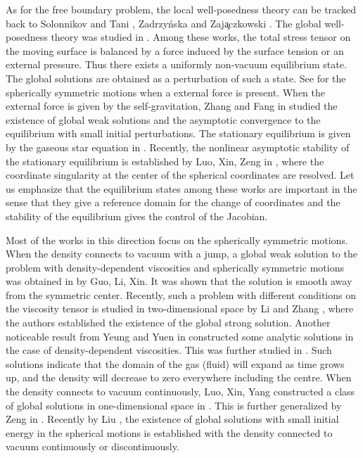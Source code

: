 \documentclass[12pt,a4paper]{amsart}
\numberwithin{equation}{section}
\theoremstyle{plain}
\theoremstyle{definition}
\begin{document}
As for the free boundary problem, the local well-posedness theory can be tracked back to Solonnikov and Tani \cite{Solonnikov1992}, Zadrzy\'nska and Zaj\c{a}czkowski \cite{Zadrzynska2001,Zadrzynska1994,Zajaczkowski1993,Zajaczkowski1995}. The global well-posedness theory was studied in \cite{Zajaczkowski1999,Zajaczkowski1993,Zajaczkowski1994}. Among these works, the total stress tensor on the moving surface is balanced by a force induced by the surface tension or an external pressure. Thus there exists a uniformly non-vacuum equilibrium state. The global solutions are obtained as a perturbation of such a state. See \cite{Zhang2007} for the spherically symmetric motions when a external force is present. When the external force is given by the self-gravitation, Zhang and Fang in \cite{Zhang2009} studied the existence of global weak solutions and the asymptotic convergence to the equilibrium with small initial perturbations. The stationary equilibrium is given by the gaseous star equation in \cite{Auchmuty1971,Chandrasekhar1957,Lieb1987}. 
Recently, %
the nonlinear asymptotic stability of the stationary equilibrium is established by Luo, Xin, Zeng in \cite{Luo2016a,Luo2016b}, where the coordinate singularity at the center of the spherical coordinates are resolved. Let us emphasize that the equilibrium states among these works are important in the sense that they give a reference domain for the change of coordinates and the stability of the equilibrium gives the control of the Jacobian. 

Most of the works in this direction focus on the spherically symmetric motions. When the density connects to vacuum with a jump, a global weak solution to the problem with density-dependent viscosities and spherically symmetric motions was obtained in \cite{Guo2012a} by Guo, Li, Xin. It was shown that the solution is smooth away from the symmetric center. Recently, such a problem with different conditions on the viscosity tensor is studied in two-dimensional space by Li and Zhang \cite{Li2016}, where the authors established the existence of the global strong solution. Another noticeable result from Yeung and Yuen in \cite{Yeung2009} constructed some analytic solutions in the case of density-dependent viscosities. This was further studied in \cite{Guo2012b}. Such solutions indicate that the domain of the gas (fluid) will expand as time grows up, and the density will decrease to zero everywhere including the centre. When the density connects to vacuum continuously, Luo, Xin, Yang constructed a class of global solutions in one-dimensional space in \cite{Luo2000}. This is further generalized by Zeng in \cite{Zeng2015}. Recently by Liu \cite{Liu2018}, the existence of global solutions with small initial energy in the spherical motions is established with the density connected to vacuum continuously or discontinuously. 
\end{document}
